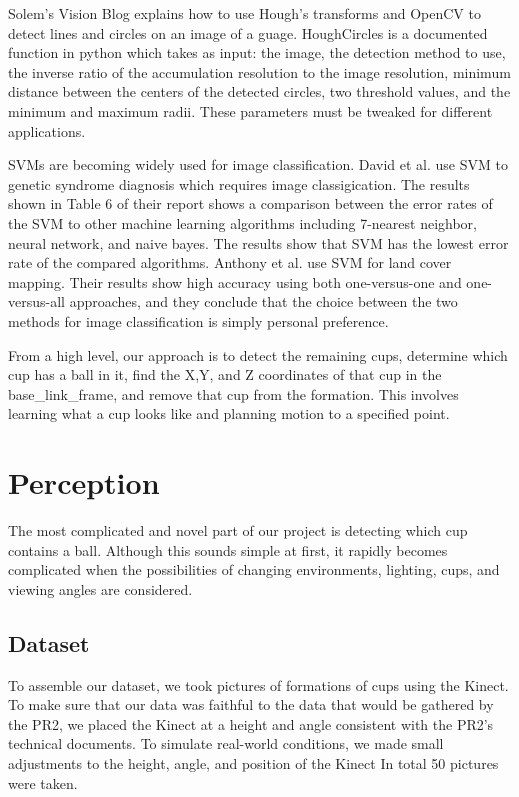 \documentclass[letterpaper, 10 pt, conference]{ieeeconf}  %
\begin{document}
Solem’s Vision Blog explains how to use Hough’s transforms and OpenCV to detect lines and circles on an image of a guage. HoughCircles is a documented function in python which takes as input: the image, the detection method to use, the inverse ratio of the accumulation resolution to the image resolution, minimum distance between the centers of the detected circles, two threshold values, and the minimum and maximum radii. These parameters must be tweaked for different applications.

SVMs are becoming widely used for image classification. David et al. use SVM to genetic syndrome diagnosis which requires image classigication. The results shown in Table 6 of their report shows a comparison between the error rates of the SVM to other machine learning algorithms including 7-nearest neighbor, neural network, and naive bayes. The results show that SVM has the lowest error rate of the compared algorithms. Anthony et al. use SVM for land cover mapping. Their results show high accuracy using both one-versus-one and one-versus-all approaches, and they conclude that the choice between the two methods for image classification is simply personal preference.

From a high level, our approach is to detect the remaining cups, determine which cup has a ball in it, find the X,Y, and Z coordinates of that cup in the base\_link\_frame, and remove that cup from the formation.  This involves learning what a cup looks like and planning motion to a specified point.

\section{Perception}

The most complicated and novel part of our project is detecting which cup contains a ball.  Although this sounds simple at first, it rapidly becomes complicated when the possibilities of changing environments, lighting, cups, and viewing angles are considered.

\subsection{Dataset}

To assemble our dataset, we took pictures of formations of cups using the Kinect.  To make sure that our data was faithful to the data that would be gathered by the PR2, we placed the Kinect at a height and angle consistent with the PR2's technical documents.  To simulate real-world conditions, we made small adjustments to the height, angle, and position of the Kinect  In total 50 pictures were taken. 
\end{document}
